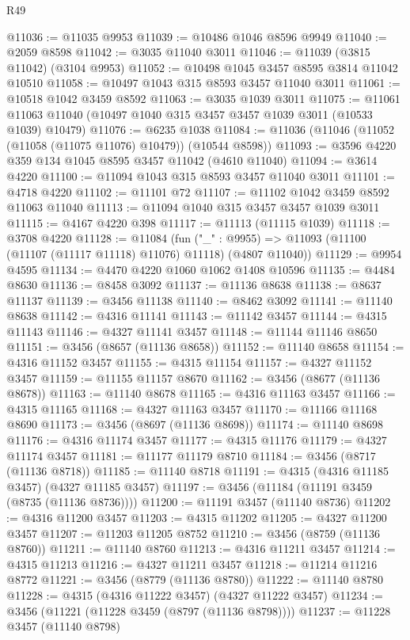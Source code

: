 \begin{lexlean}{R49}
\begin{coremodule}
@11036 := @11035 @9953
@11039 := @10486 @1046 @8596 @9949
@11040 := @2059 @8598
@11042 := @3035 @11040 @3011
@11046 := @11039 (@3815 @11042) (@3104 @9953)
@11052 := @10498 @1045 @3457 @8595 @3814 @11042 @10510
@11058 := @10497 @1043 @315 @8593 @3457 @11040 @3011
@11061 := @10518 @1042 @3459 @8592
@11063 := @3035 @1039 @3011
@11075 := @11061 @11063 @11040 (@10497 @1040 @315 @3457 @3457 @1039 @3011 (@10533 @1039) @10479)
@11076 := @6235 @1038
@11084 := @11036 (@11046 (@11052 (@11058 (@11075 @11076) @10479)) (@10544 @8598))
@11093 := @3596 @4220 @359 @134 @1045 @8595 @3457 @11042 (@4610 @11040)
@11094 := @3614 @4220
@11100 := @11094 @1043 @315 @8593 @3457 @11040 @3011
@11101 := @4718 @4220
@11102 := @11101 @72
@11107 := @11102 @1042 @3459 @8592 @11063 @11040
@11113 := @11094 @1040 @315 @3457 @3457 @1039 @3011
@11115 := @4167 @4220 @398
@11117 := @11113 (@11115 @1039)
@11118 := @3708 @4220
@11128 := @11084
    (fun ("_" : @9955) => @11093 (@11100 (@11107 (@11117 @11118) @11076) @11118) (@4807 @11040))
@11129 := @9954 @4595
@11134 := @4470 @4220 @1060 @1062 @1408 @10596
@11135 := @4484 @8630
@11136 := @8458 @3092
@11137 := @11136 @8638
@11138 := @8637 @11137
@11139 := @3456 @11138
@11140 := @8462 @3092
@11141 := @11140 @8638
@11142 := @4316 @11141
@11143 := @11142 @3457
@11144 := @4315 @11143
@11146 := @4327 @11141 @3457
@11148 := @11144 @11146 @8650
@11151 := @3456 (@8657 (@11136 @8658))
@11152 := @11140 @8658
@11154 := @4316 @11152 @3457
@11155 := @4315 @11154
@11157 := @4327 @11152 @3457
@11159 := @11155 @11157 @8670
@11162 := @3456 (@8677 (@11136 @8678))
@11163 := @11140 @8678
@11165 := @4316 @11163 @3457
@11166 := @4315 @11165
@11168 := @4327 @11163 @3457
@11170 := @11166 @11168 @8690
@11173 := @3456 (@8697 (@11136 @8698))
@11174 := @11140 @8698
@11176 := @4316 @11174 @3457
@11177 := @4315 @11176
@11179 := @4327 @11174 @3457
@11181 := @11177 @11179 @8710
@11184 := @3456 (@8717 (@11136 @8718))
@11185 := @11140 @8718
@11191 := @4315 (@4316 @11185 @3457) (@4327 @11185 @3457)
@11197 := @3456 (@11184 (@11191 @3459 (@8735 (@11136 @8736))))
@11200 := @11191 @3457 (@11140 @8736)
@11202 := @4316 @11200 @3457
@11203 := @4315 @11202
@11205 := @4327 @11200 @3457
@11207 := @11203 @11205 @8752
@11210 := @3456 (@8759 (@11136 @8760))
@11211 := @11140 @8760
@11213 := @4316 @11211 @3457
@11214 := @4315 @11213
@11216 := @4327 @11211 @3457
@11218 := @11214 @11216 @8772
@11221 := @3456 (@8779 (@11136 @8780))
@11222 := @11140 @8780
@11228 := @4315 (@4316 @11222 @3457) (@4327 @11222 @3457)
@11234 := @3456 (@11221 (@11228 @3459 (@8797 (@11136 @8798))))
@11237 := @11228 @3457 (@11140 @8798)

\end{coremodule}
\end{lexlean}
